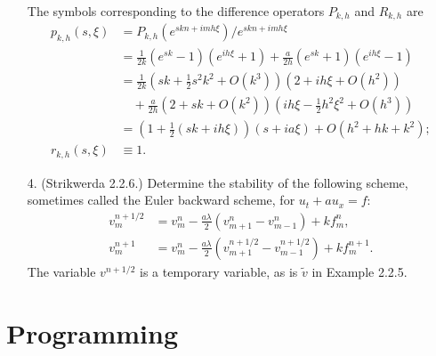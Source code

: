 \documentclass{article}
\begin{document}
\begin{itemize}
The symbols corresponding to the difference operators $P_{k,h}$ and $R_{k,h}$ are
\begin{align*}
p_{k,h}(s,\xi) & = P_{k,h} \left( e^{skn + imh\xi} \right) / e^{skn + imh\xi} \\
               & = \frac{1}{2k} \left( e^{sk} - 1 \right) \left( e^{ih\xi} + 1 \right) + \frac{a}{2h} \left( e^{sk} + 1 \right) \left( e^{ih\xi} - 1 \right) \\
               & = \frac{1}{2k} \left( sk + \frac{1}{2} s^2 k^2 + O \left( k^3 \right) \right) \left( 2 + i h \xi + O \left( h^2 \right) \right) \\
               & \quad {} + \frac{a}{2h} \left( 2 + s k + O \left( k^2 \right) \right) \left( i h \xi - \frac{1}{2} h^2 \xi^2 + O \left( h^3 \right) \right) \\
               & = \left( 1 + \frac{1}{2} \left( sk + i h \xi \right) \right) \left( s + i a \xi \right) + O \left( h^2 + h k + k^2 \right); \\
r_{k,h}(s,\xi) & \equiv 1.
\end{align*}

\item[4.] (Strikwerda 2.2.6.) Determine the stability of the following scheme, sometimes called the Euler backward scheme, for $u_t + au_x = f$:
\begin{align*}
v^{n+1/2}_m & = v^n_m - \frac{a \lambda}{2} \left( v^n_{m+1} - v^n_{m-1} \right) + k f^n_m, \\
v^{n+1}_m & = v^n_m - \frac{a \lambda}{2} \left( v^{n+1/2}_{m+1} - v^{n+1/2}_{m-1} \right) + k f^{n+1}_m.
\end{align*}
The variable $v^{n+1/2}$ is a temporary variable, as is $\tilde{v}$ in Example 2.2.5.

\end{itemize}

\section{Programming}
\end{document}
